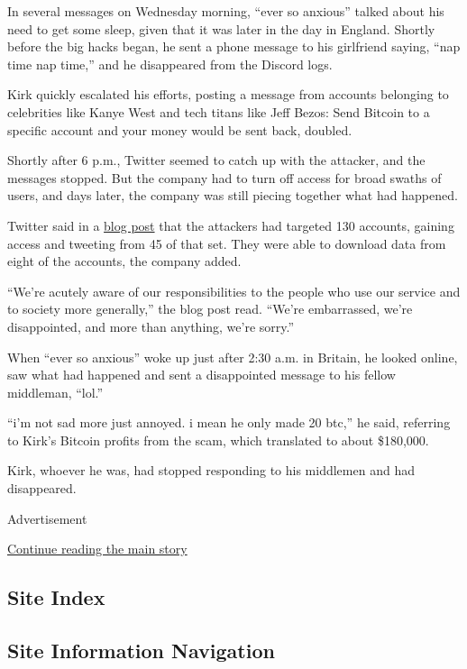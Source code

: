 In several messages on Wednesday morning, ``ever so anxious'' talked
about his need to get some sleep, given that it was later in the day in
England. Shortly before the big hacks began, he sent a phone message to
his girlfriend saying, ``nap time nap time,'' and he disappeared from
the Discord logs.

Kirk quickly escalated his efforts, posting a message from accounts
belonging to celebrities like Kanye West and tech titans like Jeff
Bezos: Send Bitcoin to a specific account and your money would be sent
back, doubled.

Shortly after 6 p.m., Twitter seemed to catch up with the attacker, and
the messages stopped. But the company had to turn off access for broad
swaths of users, and days later, the company was still piecing together
what had happened.

Twitter said in a
\href{https://blog.twitter.com/en_us/topics/company/2020/an-update-on-our-security-incident.html}{blog
post} that the attackers had targeted 130 accounts, gaining access and
tweeting from 45 of that set. They were able to download data from eight
of the accounts, the company added.

``We're acutely aware of our responsibilities to the people who use our
service and to society more generally,'' the blog post read. ``We're
embarrassed, we're disappointed, and more than anything, we're sorry.''

When ``ever so anxious'' woke up just after 2:30 a.m. in Britain, he
looked online, saw what had happened and sent a disappointed message to
his fellow middleman, ``lol.''

``i'm not sad more just annoyed. i mean he only made 20 btc,'' he said,
referring to Kirk's Bitcoin profits from the scam, which translated to
about \$180,000.

Kirk, whoever he was, had stopped responding to his middlemen and had
disappeared.

Advertisement

\protect\hyperlink{after-bottom}{Continue reading the main story}

\hypertarget{site-index}{%
\subsection{Site Index}\label{site-index}}

\hypertarget{site-information-navigation}{%
\subsection{Site Information
Navigation}\label{site-information-navigation}}

